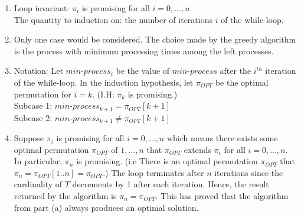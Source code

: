 \documentclass[11pt]{article}
\begin{document}
\begin{enumerate}[label=(\alph*)]
\item\label{invariant}%
Loop invariant: $\pi_i$ is promising for all $i = 0, ..., n$.\\
The quantity to induction on: the number of iterations $i$ of the while-loop.

\item\label{cases}%
Only one case would be considered. The choice made by the greedy algorithm is the process with minimum processing times among the left processes.

\item\label{subcases}%
Notation: Let $min$-$process_{i}$ be the value of $min$-$process$ after the $i^{th}$ iteration of the while-loop. In the induction hypothesis, let $\pi_{OPT}$ be the optimal permutation for $i = k$. (I.H: $\pi_{k}$ is promising.)\\
Subcase 1: $min$-$process_{k + 1} = \pi_{OPT}[k + 1]$\\
Subcase 2:  $min$-$process_{k+ 1} \neq \pi_{OPT}[k+1]$

\item\label{conclusion}%
Suppose $\pi_i$ is promising for all $ i= 0, ..., n$ which means there exists some optimal permutation $\pi_{OPT}$ of $1, ..., n$ that $\pi_{OPT}$ extends $\pi_i$ for all $i = 0, ..., n$.\\
In particular, $\pi_n$ is promising. (i.e There is an optimal permutation $\pi_{OPT}$ that $\pi_n = \pi_{OPT}[1..n]=\pi_{OPT}$.) The loop terminates after $n$ iterations since the cardinality of $T$ decrements by 1 after each iteration. Hence, the result returned by the algorithm is $\pi_n = \pi_{OPT}$. This has proved that the algorithm from part (a) always produces an optimal solution.


\end{enumerate}
\end{document}
